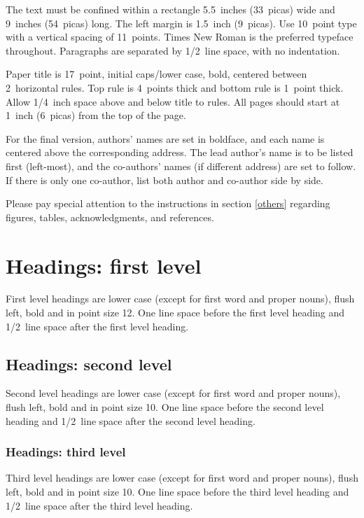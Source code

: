 \documentclass{article} %
\begin{document}
The text must be confined within a rectangle 5.5~inches (33~picas) wide and
9~inches (54~picas) long. The left margin is 1.5~inch (9~picas).
Use 10~point type with a vertical spacing of 11~points. Times New Roman is the
preferred typeface throughout. Paragraphs are separated by 1/2~line space,
with no indentation.

Paper title is 17~point, initial caps/lower case, bold, centered between
2~horizontal rules. Top rule is 4~points thick and bottom rule is 1~point
thick. Allow 1/4~inch space above and below title to rules. All pages should
start at 1~inch (6~picas) from the top of the page.


For the final version, authors' names are
set in boldface, and each name is centered above the corresponding
address. The lead author's name is to be listed first (left-most), and
the co-authors' names (if different address) are set to follow. If
there is only one co-author, list both author and co-author side by side.

Please pay special attention to the instructions in section \ref{others}
regarding figures, tables, acknowledgments, and references.

\section{Headings: first level}
\label{headings}

First level headings are lower case (except for first word and proper nouns),
flush left, bold and in point size 12. One line space before the first level
heading and 1/2~line space after the first level heading.

\subsection{Headings: second level}

Second level headings are lower case (except for first word and proper nouns),
flush left, bold and in point size 10. One line space before the second level
heading and 1/2~line space after the second level heading.

\subsubsection{Headings: third level}

Third level headings are lower case (except for first word and proper nouns),
flush left, bold and in point size 10. One line space before the third level
heading and 1/2~line space after the third level heading.
\end{document}

